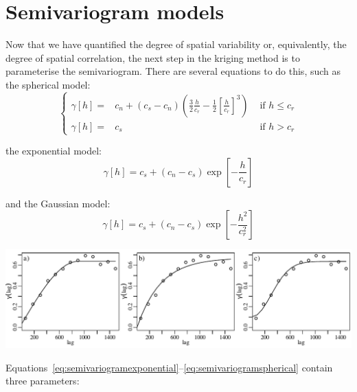 \section{Semivariogram models}
\label{sec:semivariogram-models}

Now that we have quantified the degree of spatial variability or,
equivalently, the degree of spatial correlation, the next step in the
kriging method is to parameterise the semivariogram. There are several
equations to do this, such as the spherical model:
\begin{equation}
  \left\{
  \begin{aligned}
    \gamma[h] = & c_n + (c_s-c_n)
    \left(\frac{3}{2}\frac{h}{c_r} -
    \frac{1}{2}\left[\frac{h}{c_r}\right]^3\right)
    & \mbox{~if~}{h}\leq{c_r}\\
    \gamma[h] = & c_s & \mbox{~if~} h>c_r
  \end{aligned}
  \right.
  \label{eq:semivariogramspherical}
\end{equation}

\noindent the exponential model:
\begin{equation}
  \gamma[h] = c_s + (c_n-c_s) \exp\left[-\frac{h}{c_r}\right]
  \label{eq:semivariogramexponential}
\end{equation}

\noindent and the Gaussian model:
\begin{equation}
  \gamma[h] = c_s + (c_n-c_s) \exp\left[-\frac{h^2}{c_r^2}\right]
  \label{eq:semivariogramgaussian}
\end{equation}

\noindent
\includegraphics[width=\textwidth]{../figures/semivariogramfit.pdf}
\begingroup {}
\label{fig:semivariogramfit}
\endgroup

Equations~\ref{eq:semivariogramexponential}--\ref{eq:semivariogramspherical}
contain three parameters:


